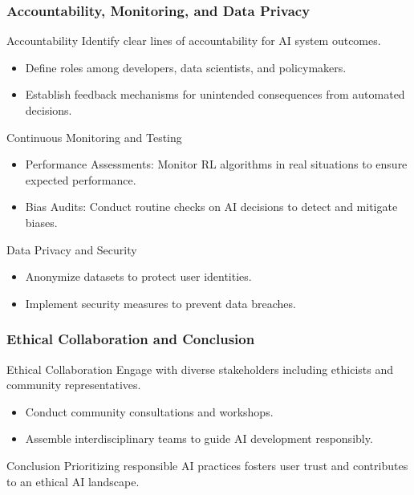 \documentclass[aspectratio=169]{beamer}
\begin{document}
\begin{frame}[fragile]
    \frametitle{Accountability, Monitoring, and Data Privacy}
    \begin{block}{Accountability}
        Identify clear lines of accountability for AI system outcomes.
        \begin{itemize}
            \item Define roles among developers, data scientists, and policymakers.
            \item Establish feedback mechanisms for unintended consequences from automated decisions.
        \end{itemize}
    \end{block}
    
    \begin{block}{Continuous Monitoring and Testing}
        \begin{itemize}
            \item Performance Assessments: Monitor RL algorithms in real situations to ensure expected performance.
            \item Bias Audits: Conduct routine checks on AI decisions to detect and mitigate biases.
        \end{itemize}
    \end{block}
    
    \begin{block}{Data Privacy and Security}
        \begin{itemize}
            \item Anonymize datasets to protect user identities.
            \item Implement security measures to prevent data breaches.
        \end{itemize}
    \end{block}
\end{frame}

\begin{frame}[fragile]
    \frametitle{Ethical Collaboration and Conclusion}
    \begin{block}{Ethical Collaboration}
        Engage with diverse stakeholders including ethicists and community representatives.
        \begin{itemize}
            \item Conduct community consultations and workshops.
            \item Assemble interdisciplinary teams to guide AI development responsibly.
        \end{itemize}
    \end{block}
    
    \begin{block}{Conclusion}
        Prioritizing responsible AI practices fosters user trust and contributes to an ethical AI landscape.
    \end{block}
\end{frame}
\end{document}
